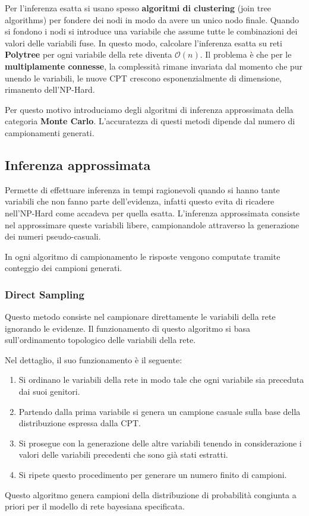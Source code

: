 Per l'inferenza esatta si usano spesso \textbf{algoritmi di clustering} (join tree algorithms) per fondere dei 
nodi in modo da avere un unico nodo finale. Quando si fondono i nodi si introduce 
una variabile che assume tutte le combinazioni dei valori delle variabili fuse.
In questo modo, calcolare l'inferenza esatta su reti  \textbf{Polytree} per ogni 
variabile della rete diventa $\mathcal{O}(n)$. Il problema è che per le \textbf{multiplamente 
connesse}, la complessità rimane invariata dal momento che pur unendo le variabili,
le nuove CPT crescono esponenzialmente di dimensione, rimanento dell'NP-Hard.

Per
questo motivo introduciamo degli algoritmi di inferenza approssimata della categoria
\textbf{Monte Carlo}. L'accuratezza di questi metodi dipende dal numero di campionamenti
generati.

\subsection{Inferenza approssimata}
Permette di effettuare inferenza in tempi ragionevoli quando si hanno tante
variabili che non fanno parte dell'evidenza, infatti questo evita di ricadere
nell'NP-Hard come accadeva per quella esatta. L'inferenza approssimata consiste
nel approssimare queste variabili libere, campionandole attraverso la generazione
dei numeri pseudo-casuali.

In ogni algoritmo di campionamento le risposte vengono computate tramite conteggio
dei campioni generati.

\subsubsection{Direct Sampling}
Questo metodo consiste nel campionare direttamente le variabili della rete ignorando
le evidenze. Il funzionamento di questo algoritmo si basa sull'ordinamento
topologico delle variabili della rete.

Nel dettaglio, il suo funzionamento è il seguente:
\begin{enumerate}
    \item Si ordinano le variabili della rete in modo tale che ogni variabile
          sia preceduta dai suoi genitori.
    \item Partendo dalla prima variabile si genera un campione casuale sulla base
          della distribuzione espressa dalla CPT.
    \item Si prosegue con la generazione delle altre variabili tenendo in
          considerazione i valori delle variabili precedenti che sono già stati
          estratti.
    \item Si ripete questo procedimento per generare un numero finito di campioni.
\end{enumerate}
Questo algoritmo genera campioni della distribuzione di probabilità congiunta a
priori per il modello di rete bayesiana specificata.

